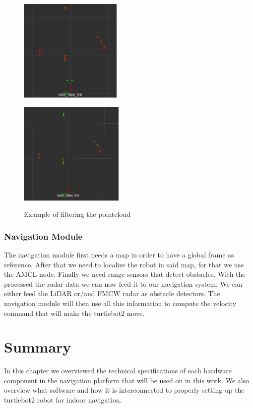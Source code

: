 \begin{figure}[ht!] 
    \begin{minipage}[b]{.49\linewidth}
        \includegraphics[height=5cm,width=\linewidth]{imgs/chapter4/notfilt.png}
        \label{fig:nonfilt}
    \end{minipage}
    \begin{minipage}[b]{.49\linewidth}
        \includegraphics[height=5cm,width=\linewidth]{imgs/chapter4/filt.png}
        \label{fig:filt}
    \end{minipage}
    \caption{Example of filtering the pointcloud}
    \label{fig:filters}
\end{figure}
\subsubsection{Navigation Module}
The navigation module first needs a map in order to have a global frame as reference. After that we need to localize the robot in said map, for that we use the \ac{AMCL} node. Finally we need range sensors that detect obstacles.
With the processed the \ac{radar} data we can now feed it to our navigation system. We can either feed the \ac{LiDAR} or/and \ac{FMCW} \ac{radar} as obstacle detectors. 
The navigation module will then use all this information to compute the velocity command  that will make the turtlebot2 move.


\section{Summary}
In this chapter we overviewed the technical specifications of each hardware component in the navigation platform that will be used on in this work. We also overview what software and how it is interconnected  to properly setting up the turtlebot2 robot for indoor navigation.


